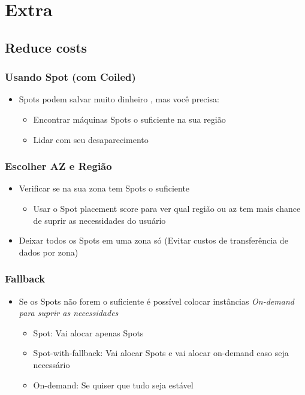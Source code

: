 \section{Extra}

\subsection{Reduce costs}

\begin{frame}
	\frametitle{Usando Spot (com Coiled)}
	\begin{itemize}
		\item Spots podem salvar muito dinheiro \cite{Spot}, mas você precisa:
			\begin{itemize}
				\item Encontrar máquinas Spots o suficiente na sua região
				\item Lidar com seu desaparecimento
			\end{itemize}
	\end{itemize}
\end{frame}

\begin{frame}
	\frametitle{Escolher AZ e Região \cite{AWSCETips}}
	\begin{itemize}
		\item Verificar se na sua zona tem Spots o suficiente
			\begin{itemize}
				\item  Usar o Spot placement score para ver qual região ou az tem mais chance de suprir as necessidades do usuário
			\end{itemize}
		\item Deixar todos os Spots em uma zona só (Evitar custos de transferência de dados por zona)
	\end{itemize}
\end{frame}

\begin{frame}
	\frametitle{Fallback}
	\begin{itemize}
		\item Se os Spots não forem o suficiente é possível colocar instâncias \it{On-demand} para suprir as necessidades
			\begin{itemize}
				\item Spot: Vai alocar apenas Spots
				\item Spot-with-fallback: Vai alocar Spots e vai alocar on-demand caso seja necessário
				\item On-demand: Se quiser que tudo seja estável
			\end{itemize}
	\end{itemize}
\end{frame}

